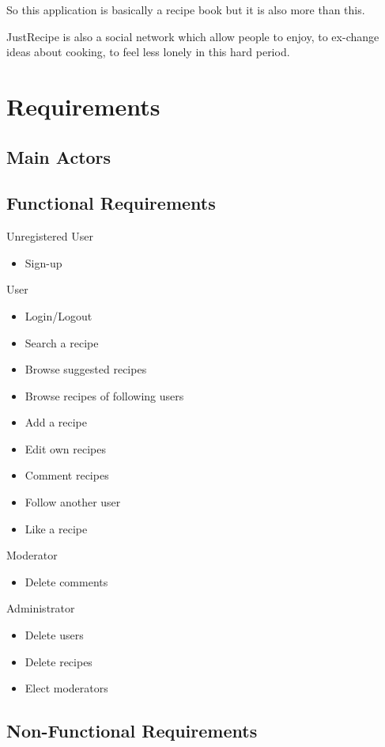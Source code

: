 \documentclass[a4paper]{report}
\begin{document}
\noindent So this application is basically a recipe book but it is also more than this.

\noindent JustRecipe is also a social network which allow people to enjoy, to ex-change ideas about cooking, to feel less lonely in this hard period.

\section{Requirements}
\subsection{Main Actors}
\subsection{Functional Requirements}
Unregistered User
\begin{itemize}
	\item Sign-up
\end{itemize}
User
\begin{itemize}
	\item Login/Logout
	\item Search a recipe
	\item Browse suggested recipes
	\item Browse recipes of following users
	\item Add a recipe
	\item Edit own recipes
	\item Comment recipes
	\item Follow another user
	\item Like a recipe
\end{itemize}
Moderator
\begin{itemize}
	\item Delete comments
\end{itemize}
Administrator
\begin{itemize}
	\item Delete users
	\item Delete recipes
	\item Elect moderators
\end{itemize}
\subsection{Non-Functional Requirements}
\end{document}
